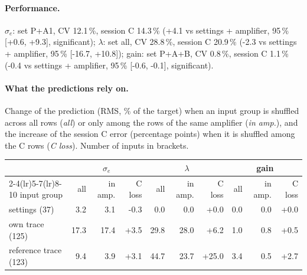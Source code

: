 \paragraph{Performance.}
$\sigma_e$: set P+A1, CV 12.1\,\%, session C 14.3\,\% (+4.1 vs settings + amplifier, 95\,\% [+0.6, +9.3], significant); $\lambda$: set all, CV 28.8\,\%, session C 20.9\,\% (-2.3 vs settings + amplifier, 95\,\% [-16.7, +10.8]); gain: set P+A+B, CV 0.8\,\%, session C 1.1\,\% (-0.4 vs settings + amplifier, 95\,\% [-0.6, -0.1], significant).
\paragraph{What the predictions rely on.} Change of the prediction (RMS, \% of the target) when an input group is shuffled across all rows (\emph{all}) or only among the rows of the same amplifier (\emph{in amp.}), and the increase of the session C error (percentage points) when it is shuffled among the C rows (\emph{C loss}). Number of inputs in brackets.
\begin{center}\footnotesize
\begin{tabular}{lrrrrrrrrr}
\toprule
 & \multicolumn{3}{c}{$\sigma_e$} & \multicolumn{3}{c}{$\lambda$} & \multicolumn{3}{c}{gain} \\
\cmidrule(lr){2-4}\cmidrule(lr){5-7}\cmidrule(lr){8-10}
input group & all & in amp. & C loss & all & in amp. & C loss & all & in amp. & C loss \\
\midrule
settings (37) & 3.2 & 3.1 & -0.3 & 0.0 & 0.0 & +0.0 & 0.0 & 0.0 & +0.0 \\
own trace (125) & 17.3 & 17.4 & +3.5 & 29.8 & 28.0 & +6.2 & 1.0 & 0.8 & +0.5 \\
reference trace (123) & 9.4 & 3.9 & +3.1 & 44.7 & 23.7 & +25.0 & 3.4 & 0.5 & +2.7 \\
\bottomrule
\end{tabular}
\end{center}
